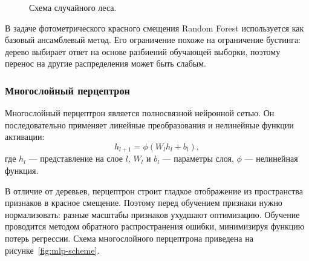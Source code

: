 \documentclass[12pt,a4paper]{article}
\begin{document}
\begin{figure}[h]
\centering
{}
\caption{Схема случайного леса.}
\label{fig:rf-scheme}
\end{figure}

В задаче фотометрического красного смещения Random Forest используется как базовый ансамблевый метод. Его ограничение похоже на ограничение бустинга: дерево выбирает ответ на основе разбиений обучающей выборки, поэтому перенос на другие распределения может быть слабым.

\subsubsection{Многослойный перцептрон}

Многослойный перцептрон является полносвязной нейронной сетью. Он последовательно применяет линейные преобразования и нелинейные функции активации:
\begin{equation}
h_{l+1} = \phi(W_l h_l + b_l),
\end{equation}
где $h_l$ — представление на слое $l$, $W_l$ и $b_l$ — параметры слоя, $\phi$ — нелинейная функция.

В отличие от деревьев, перцептрон строит гладкое отображение из пространства признаков в красное смещение. Поэтому перед обучением признаки нужно нормализовать: разные масштабы признаков ухудшают оптимизацию. Обучение проводится методом обратного распространения ошибки, минимизируя функцию потерь регрессии. Схема многослойного перцептрона приведена на рисунке~\ref{fig:mlp-scheme}.
\end{document}
